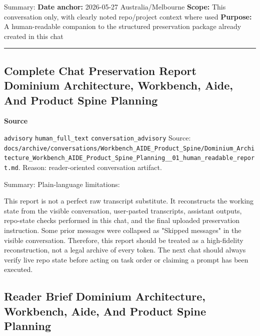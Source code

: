 \documentclass[9pt,a4paper,openany]{book}
\newcommand{\vonecallout}[3]{\par\medskip\noindent\begingroup\setlength{\fboxsep}{7pt}\colorbox{DomCalloutBg}{\parbox{0.94\linewidth}{\textbf{\textcolor{#1}{#2}}\par #3}}\endgroup\par\medskip}
\begin{document}
Summary: \textbf{Date anchor:} 2026-\allowbreak{}05-\allowbreak{}27 Australia/\allowbreak{}Melbourne \textbf{Scope:} This conversation only, with clearly noted repo/\allowbreak{}project context where used \textbf{Purpose:} A human-\allowbreak{}readable companion to the structured preservation package already created in this chat


\par\medskip\hrule\medskip


\subsection{Complete Chat Preservation Report Dominium Architecture, Workbench, Aide, And Product Spine Planning}

\vonecallout{DomSlate}{Source}{\texttt{advisory} \texttt{human\_\allowbreak{}full\_\allowbreak{}text} \texttt{conversation\_\allowbreak{}advisory} Source: \texttt{docs/\allowbreak{}archive/\allowbreak{}conversations/\allowbreak{}Workbench\_\allowbreak{}AIDE\_\allowbreak{}Product\_\allowbreak{}Spine/\allowbreak{}Dominium\_\allowbreak{}Architecture\_\allowbreak{}Workbench\_\allowbreak{}AIDE\_\allowbreak{}Product\_\allowbreak{}Spine\_\allowbreak{}Planning\_\allowbreak{}\_\allowbreak{}01\_\allowbreak{}human\_\allowbreak{}readable\_\allowbreak{}report.\allowbreak{}md}.\allowbreak{} Reason: reader-\allowbreak{}oriented conversation artifact.\allowbreak{}}

Summary: Plain-\allowbreak{}language limitations:


This report is not a perfect raw transcript substitute.\allowbreak{} It reconstructs the working state from the visible conversation, user-\allowbreak{}pasted transcripts, assistant outputs, repo-\allowbreak{}state checks performed in this chat, and the final uploaded preservation instruction.\allowbreak{} Some prior messages were collapsed as "Skipped messages" in the visible conversation.\allowbreak{} Therefore, this report should be treated as a high-\allowbreak{}fidelity reconstruction, not a legal archive of every token.\allowbreak{} The next chat should always verify live repo state before acting on task order or claiming a prompt has been executed.\allowbreak{}



\subsection{Reader Brief Dominium Architecture, Workbench, Aide, And Product Spine Planning}
\end{document}
